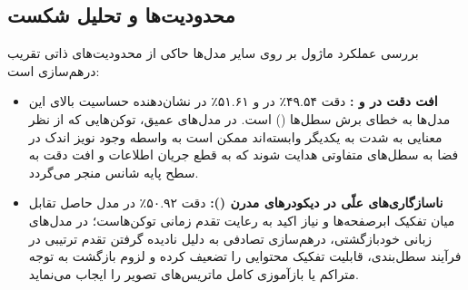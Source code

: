 \subsection{محدودیت‌ها و تحلیل شکست}
بررسی عملکرد ماژول بر روی سایر مدل‌ها حاکی از محدودیت‌های ذاتی تقریب درهم‌سازی است:
\begin{itemize}
    \item \textbf{افت دقت در  و :} دقت ۴۹.۵۴٪ در  و ۵۱.۶۱٪ در  نشان‌دهنده حساسیت بالای این مدل‌ها به خطای برش سطل‌ها () است. در مدل‌های عمیق، توکن‌هایی که از نظر معنایی به شدت به یکدیگر وابسته‌اند ممکن است به واسطه وجود نویز اندک در فضا به سطل‌های متفاوتی هدایت شوند که به قطع جریان اطلاعات و افت دقت به سطح پایه شانس منجر می‌گردد.
    \item \textbf{ناسازگاری‌های علّی در دیکودرهای مدرن ():} دقت ۵۰.۹۲٪ در مدل  حاصل تقابل میان تفکیک ابرصفحه‌ها و نیاز اکید به رعایت تقدم زمانی توکن‌هاست؛ در مدل‌های زبانی خودبازگشتی، درهم‌سازی تصادفی به دلیل نادیده گرفتن تقدم ترتیبی در فرآیند سطل‌بندی، قابلیت تفکیک محتوایی را تضعیف کرده و لزوم بازگشت به توجه متراکم یا بازآموزی کامل ماتریس‌های تصویر را ایجاب می‌نماید.
\end{itemize}
